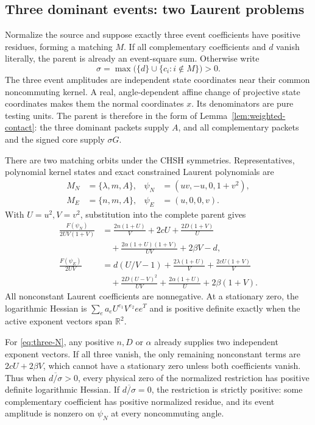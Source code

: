 \subsection{Three dominant events: two Laurent problems}
Normalize the source and suppose exactly three event coefficients have positive residues, forming a matching $M$. If all complementary coefficients and $d$ vanish literally, the parent is already an event-square sum. Otherwise write
\[
\sigma=\max\bigl(\{d\}\cup\{c_i:i\notin M\}\bigr)>0.
\]
The three event amplitudes are independent state coordinates near their common noncommuting kernel. A real, angle-dependent affine change of projective state coordinates makes them the normal coordinates $x$. Its denominators are pure testing units. The parent is therefore in the form of Lemma~\ref{lem:weighted-contact}: the three dominant packets supply $A$, and all complementary packets and the signed core supply $\sigma G$.

There are two matching orbits under the CHSH symmetries. Representatives, polynomial kernel states and exact constrained Laurent polynomials are
\begin{align*}
M_N&=\{\lambda,m,A\}, &\psi_N&=(uv,-u,0,1+v^2),\\
M_E&=\{n,m,A\}, &\psi_E&=(u,0,0,v).
\end{align*}
With $U=u^2,V=v^2$, substitution into the complete parent gives
\begin{align}
\frac{F(\psi_N)}{2UV(1+V)}
&=\frac{2n(1+U)}V+2cU+\frac{2D(1+V)}U\nonumber\\
&\quad +\frac{2\alpha(1+U)(1+V)}{UV}+2\beta V-d,
\label{eq:three-N}\\
\frac{F(\psi_E)}{2UV}
&=d(U/V-1)+\frac{2\lambda(1+U)}V+\frac{2cU(1+V)}V\nonumber\\
&\quad +\frac{2D(U-V)^2}{UV}+\frac{2\alpha(1+U)}U+2\beta(1+V).
\label{eq:three-E}
\end{align}
All nonconstant Laurent coefficients are nonnegative. At a stationary zero, the logarithmic Hessian is
$\sum_e a_e U^{e_1}V^{e_2}ee^T$ and is positive definite exactly when the active exponent vectors span $\mathbb R^2$.

For \eqref{eq:three-N}, any positive $n,D$ or $\alpha$ already supplies two independent exponent vectors. If all three vanish, the only remaining nonconstant terms are $2cU+2\beta V$, which cannot have a stationary zero unless both coefficients vanish. Thus when $\overline{d/\sigma}>0$, every physical zero of the normalized restriction has positive definite logarithmic Hessian. If $\overline{d/\sigma}=0$, the restriction is strictly positive: some complementary coefficient has positive normalized residue, and its event amplitude is nonzero on $\psi_N$ at every noncommuting angle.


